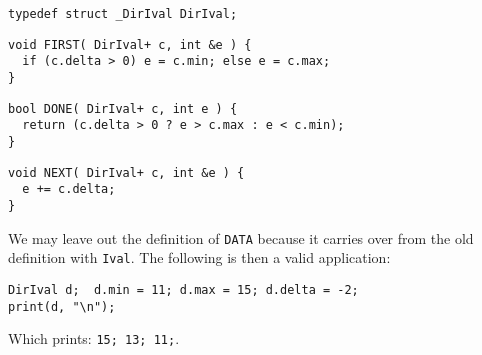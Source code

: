 \documentclass{sigplanconf}
\begin{document}
\begin{samepage}
\begin{verbatim}
typedef struct _DirIval DirIval;
\end{verbatim}
\end{samepage}
\begin{samepage}
\begin{verbatim}
void FIRST( DirIval+ c, int &e ) {
  if (c.delta > 0) e = c.min; else e = c.max;
}
\end{verbatim}
\end{samepage}
\begin{samepage}
\begin{verbatim}
bool DONE( DirIval+ c, int e ) {
  return (c.delta > 0 ? e > c.max : e < c.min);
}
\end{verbatim}
\end{samepage}
\begin{samepage}
\begin{verbatim}
void NEXT( DirIval+ c, int &e ) { 
  e += c.delta; 
}
\end{verbatim}
\end{samepage}
We may leave out the definition of \verb+DATA+ because it carries over
from the old definition with \verb+Ival+. The following is then a
valid application:
\begin{samepage}
\begin{verbatim}
DirIval d;  d.min = 11; d.max = 15; d.delta = -2;
print(d, "\n");
\end{verbatim}
\end{samepage}
Which prints: \verb+15; 13; 11;+.
\end{document}
